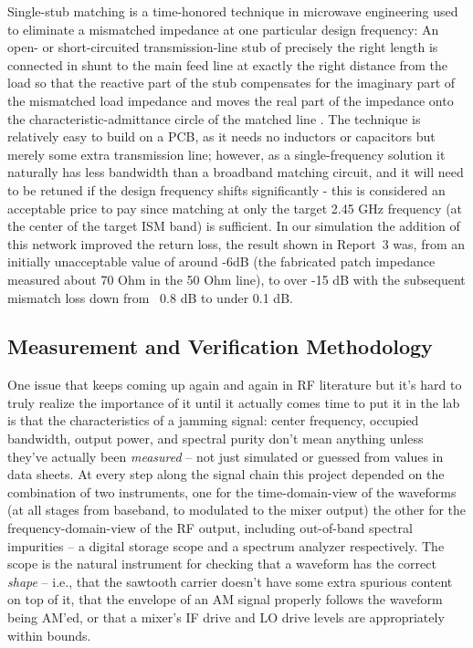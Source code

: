 \documentclass[12pt,a4paper]{report}
\begin{document}
	\vspace{0.5cm}
	
	Single-stub matching is a time-honored technique in microwave engineering used to eliminate a mismatched impedance at one particular design frequency: An open- or short-circuited transmission-line stub of precisely the right length is connected in shunt to the main feed line at exactly the right distance from the load so that the reactive part of the stub compensates for the imaginary part of the mismatched load impedance and moves the real part of the impedance onto the characteristic-admittance circle of the matched line \cite{ref16}. The technique is relatively easy to build on a PCB, as it needs no inductors or capacitors but merely some extra transmission line; however, as a single-frequency solution it naturally has less bandwidth than a broadband matching circuit, and it will need to be retuned if the design frequency shifts significantly - this is considered an acceptable price to pay since matching at only the target 2.45 GHz frequency (at the center of the target ISM band) is sufficient. In our simulation the addition of this network improved the return loss, the result shown in Report~3 was, from an initially unacceptable value of around -6dB (the fabricated patch impedance measured about 70 Ohm in the 50 Ohm line), to over -15 dB with the subsequent mismatch loss down from ~0.8 dB to under 0.1 dB.
	
	\subsection{Measurement and Verification Methodology}
	
	One issue that keeps coming up again and again in RF literature but it's hard to truly realize the importance of it until it actually comes time to put it in the lab is that the characteristics of a jamming signal: center frequency, occupied bandwidth, output power, and spectral purity don't mean anything unless they've actually been \emph{measured} -- not just simulated or guessed from values in data sheets. At every step along the signal chain this project depended on the combination of two instruments, one for the time-domain-view of the waveforms (at all stages from baseband, to modulated to the mixer output) the other for the frequency-domain-view of the RF output, including out-of-band spectral impurities -- a digital storage scope and a spectrum analyzer respectively. The scope is the natural instrument for checking that a waveform has the correct \emph{shape} -- i.e., that the sawtooth carrier doesn't have some extra spurious content on top of it, that the envelope of an AM signal properly follows the waveform being AM'ed, or that a mixer's IF drive and LO drive levels are appropriately within bounds. 
	
\end{document}

